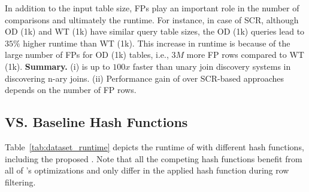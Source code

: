 In addition to the input table size, FPs play an important role in the number of comparisons and ultimately the runtime.
For instance, in case of SCR, although OD (1k) and WT (1k) have similar query table sizes, the OD (1k) queries lead to $35\%$ higher runtime than WT (1k). This increase in runtime is because of the large number of FPs for OD (1k) tables, i.e., $3M$ more FP rows compared to WT (1k).
\newline
\textbf{Summary.}
(i) \system is up to $100x$ faster than unary join discovery systems in discovering n-ary joins.
(ii) Performance gain of \system over SCR-based approaches depends on the number of FP rows.


\subsection{\hash VS. Baseline Hash Functions} \label{subsubsec:xash_vs_hashes}
Table~\ref{tab:dataset_runtime} depicts the runtime of \system with different hash functions, including the proposed \hash.
Note that all the competing hash functions benefit from all of \system's optimizations and only differ in the applied hash function during row filtering.

